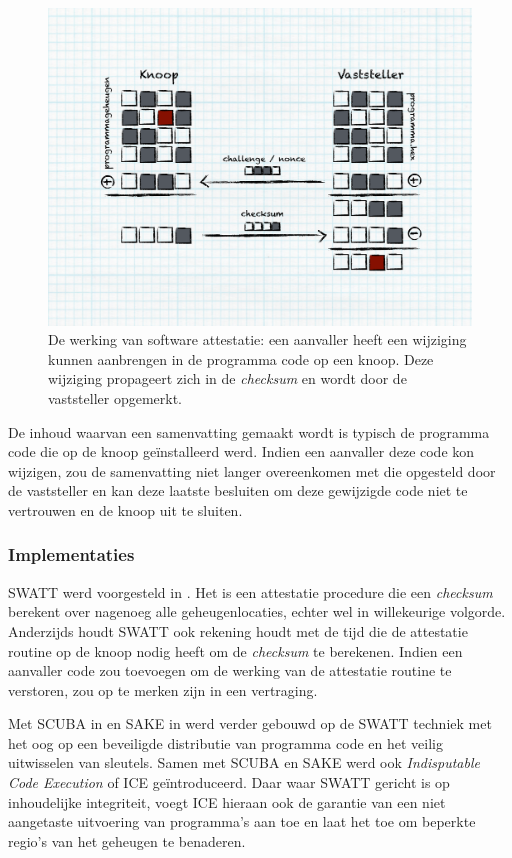 \begin{figure}
  \centering
  \includegraphics[width=0.9\linewidth]{resources/attestation-process.pdf}
  \caption{De werking van software attestatie: een aanvaller heeft een
  wijziging kunnen aanbrengen in de programma code op een knoop. Deze wijziging
  propageert zich in de \emph{checksum} en wordt door de vaststeller opgemerkt.}
  \label{fig:attestation-process}
\end{figure}

De inhoud waarvan een samenvatting gemaakt wordt is typisch de programma code
die op de knoop ge\"installeerd werd. Indien een aanvaller deze code kon
wijzigen, zou de samenvatting niet langer overeenkomen met die opgesteld door
de vaststeller en kan deze laatste besluiten om deze gewijzigde code niet te
vertrouwen en de knoop uit te sluiten.

\subsubsection*{Implementaties}

SWATT werd voorgesteld in \cite{seshadri2004swatt}. Het is een attestatie
procedure die een \emph{checksum} berekent over nagenoeg alle geheugenlocaties,
echter wel in willekeurige volgorde. Anderzijds houdt SWATT ook rekening houdt
met de tijd die de attestatie routine op de knoop nodig heeft om de
\emph{checksum} te berekenen. Indien een aanvaller code zou toevoegen om de
werking van de attestatie routine te verstoren, zou op te merken zijn in een
vertraging.

Met SCUBA in \cite{seshadri2006scuba} en SAKE in \cite{seshadri2008sake} werd
verder gebouwd op de SWATT techniek met het oog op een beveiligde distributie
van programma code en het veilig uitwisselen van sleutels. Samen met SCUBA en
SAKE werd ook \emph{Indisputable Code Execution} of ICE ge\"introduceerd. Daar
waar SWATT gericht is op inhoudelijke integriteit, voegt ICE hieraan ook de
garantie van een niet aangetaste uitvoering van programma's aan toe en laat het
toe om beperkte regio's van het geheugen te benaderen.


